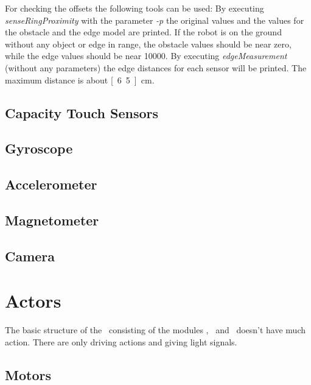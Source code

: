 For checking the offsets the following tools can be used: By executing {\it senseRingProximity} with the parameter {\it -p} the original values and the values for the obstacle and the edge model are printed. If the robot is on the ground without any object or edge in range, the obstacle values should be near zero, while the edge values should be near 10000. By executing {\it edgeMeasurement} (without any parameters) the edge distances for each sensor will be printed. The maximum distance is about \unit[6.5]{cm}.

\subsection{Capacity Touch Sensors}

\working

\subsection{Gyroscope}

\working

\subsection{Accelerometer}

\working

\subsection{Magnetometer}

\working

\subsection{Camera}

\working

\section{Actors}

The basic structure of the \amiro\ consisting of the modules \diwheel, \power\ and \light\ doesn't have much action. There are only driving actions and giving light signals.

\subsection{Motors}

